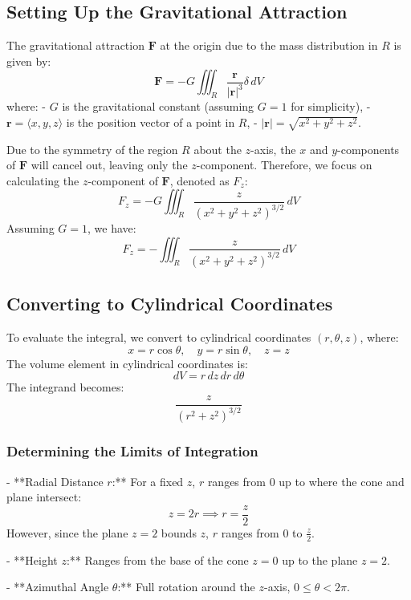 \documentclass[11pt]{article}
\begin{document}
\newpage

\subsection{Setting Up the Gravitational Attraction}

The gravitational attraction \( \mathbf{F} \) at the origin due to the mass distribution in \( R \) is given by:
\[
\mathbf{F} = -G \iiint_{R} \frac{\mathbf{r}}{|\mathbf{r}|^3} \delta \, dV
\]
where:
- \( G \) is the gravitational constant (assuming \( G = 1 \) for simplicity),
- \( \mathbf{r} = \langle x, y, z \rangle \) is the position vector of a point in \( R \),
- \( |\mathbf{r}| = \sqrt{x^2 + y^2 + z^2} \).

Due to the symmetry of the region \( R \) about the \( z \)-axis, the \( x \) and \( y \)-components of \( \mathbf{F} \) will cancel out, leaving only the \( z \)-component. Therefore, we focus on calculating the \( z \)-component of \( \mathbf{F} \), denoted as \( F_z \):
\[
F_z = -G \iiint_{R} \frac{z}{(x^2 + y^2 + z^2)^{3/2}} \, dV
\]
Assuming \( G = 1 \), we have:
\[
F_z = - \iiint_{R} \frac{z}{(x^2 + y^2 + z^2)^{3/2}} \, dV
\]

\newpage

\subsection{Converting to Cylindrical Coordinates}

To evaluate the integral, we convert to cylindrical coordinates \((r, \theta, z)\), where:
\[
x = r\cos\theta, \quad y = r\sin\theta, \quad z = z
\]
The volume element in cylindrical coordinates is:
\[
dV = r \, dz \, dr \, d\theta
\]
The integrand becomes:
\[
\frac{z}{(r^2 + z^2)^{3/2}}
\]

\subsubsection*{Determining the Limits of Integration}
- **Radial Distance \( r \):** For a fixed \( z \), \( r \) ranges from \( 0 \) up to where the cone and plane intersect:
  \[
  z = 2r \implies r = \frac{z}{2}
  \]
  However, since the plane \( z = 2 \) bounds \( z \), \( r \) ranges from \( 0 \) to \( \frac{z}{2} \).
  
- **Height \( z \):** Ranges from the base of the cone \( z = 0 \) up to the plane \( z = 2 \).
  
- **Azimuthal Angle \( \theta \):** Full rotation around the \( z \)-axis, \( 0 \leq \theta < 2\pi \).
\end{document}
